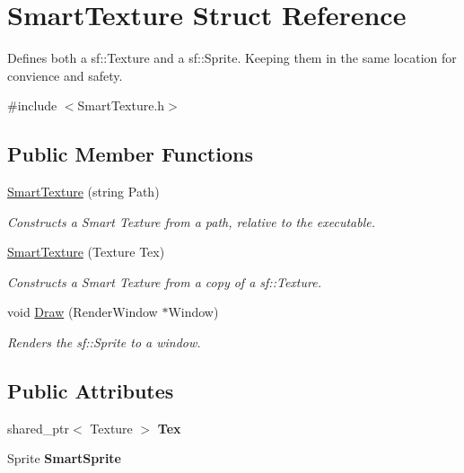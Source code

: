 \hypertarget{struct_smart_texture}{}\section{Smart\+Texture Struct Reference}
\label{struct_smart_texture}


Defines both a sf\+::\+Texture and a sf\+::\+Sprite. Keeping them in the same location for convience and safety.  




{\ttfamily \#include $<$Smart\+Texture.\+h$>$}

\subsection*{Public Member Functions}
\begin{DoxyCompactItemize}
\item 
\hyperlink{struct_smart_texture_a1709abdbcbba9136de0acce7a243a88e}{Smart\+Texture} (string Path)
\begin{DoxyCompactList}\small\item\em Constructs a Smart Texture from a path, relative to the executable. \end{DoxyCompactList}\item 
\hyperlink{struct_smart_texture_a46ac388243d615cbd00feac8fcb0f7fc}{Smart\+Texture} (Texture Tex)
\begin{DoxyCompactList}\small\item\em Constructs a Smart Texture from a copy of a sf\+::\+Texture. \end{DoxyCompactList}\item 
void \hyperlink{struct_smart_texture_ae8e39d3a1b4b325c1da2d300ba623e17}{Draw} (Render\+Window $\ast$Window)
\begin{DoxyCompactList}\small\item\em Renders the sf\+::\+Sprite to a window. \end{DoxyCompactList}\end{DoxyCompactItemize}
\subsection*{Public Attributes}
\begin{DoxyCompactItemize}
\item 
\mbox{\label{struct_smart_texture_abd3e8f969fccfab6c0bec0a3968c0f1a}} 
shared\+\_\+ptr$<$ Texture $>$ {\bfseries Tex}
\item 
\mbox{\label{struct_smart_texture_ac5a0faec8f404b30eea9edd1ee4690f6}} 
Sprite {\bfseries Smart\+Sprite}
\end{DoxyCompactItemize}


